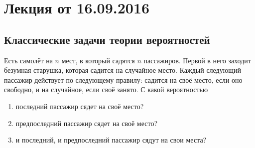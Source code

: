 \documentclass[a4paper,12pt]{article}
\begin{document}
	\maketitle
	\section{Лекция от 16.09.2016}
	\subsection{Классические задачи теории вероятностей}
	\begin{problem}
		Есть самолёт на \(n\) мест, в который садятся \(n\) пассажиров. Первой в него заходит безумная старушка, которая садится на случайное место. Каждый следующий пассажир действует по следующему правилу: садится на своё место, если оно свободно, и на случайное, если своё занято. С какой вероятностью
		\begin{enumerate}
			\item последний пассажир сядет на своё место?
			\item предпоследний пассажир сядет на своё место?
			\item и последний, и предпоследний пассажир сядут на свои места?
		\end{enumerate}
	\end{problem}
\end{document}

